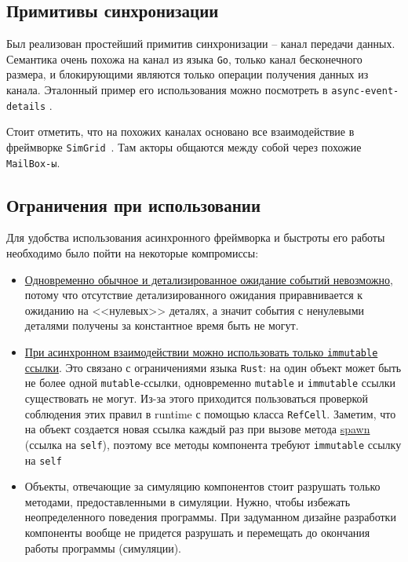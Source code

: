 \subsection{Примитивы синхронизации}

Был реализован простейший примитив синхронизации -- канал передачи данных. Семантика очень похожа на канал из языка \texttt{Go}, только канал бесконечного размера, и блокирующими являются только операции получения данных из канала. Эталонный пример его использования можно посмотреть в \texttt{async-event-details} \cite{async-event-details-example}. 

Стоит отметить, что на похожих каналах основано все взаимодействие в фреймворке \texttt{SimGrid}~\cite{simgrid-example}. Там акторы общаются между собой через похожие \texttt{MailBox-ы}.


\subsection{Ограничения при использовании}
Для удобства использования асинхронного фреймворка и быстроты его работы необходимо было пойти на некоторые компромиссы: 
\begin{itemize}
    \item 
    \underline{Одновременно обычное и детализированное ожидание событий невозможно}, потому что отсутствие детализированного ожидания приравнивается к ожиданию на <<нулевых>> деталях, а значит события с ненулевыми деталями получены за константное время быть не могут. 
     
    \item 
    \underline{При асинхронном взаимодействии можно использовать только \texttt{immutable} ссылки}. Это связано с ограничениями языка \texttt{Rust}: на один объект может быть не более одной \texttt{mutable}-ссылки, одновременно \texttt{mutable} и \texttt{immutable} ссылки существовать не могут. Из-за этого приходится пользоваться проверкой соблюдения этих правил в runtime с помощью класса \texttt{RefCell}. Заметим, что на объект создается новая ссылка каждый раз при вызове метода \hyperref[spawn]{spawn} (ссылка на \texttt{self}), поэтому все методы компонента требуют \texttt{immutable} ссылку на \texttt{self}
    
    \item 
    Объекты, отвечающие за симуляцию компонентов стоит разрушать только методами, предоставленными в симуляции. Нужно, чтобы избежать неопределенного поведения программы. При задуманном дизайне разработки компоненты вообще не придется разрушать и перемещать до окончания работы программы (симуляции).
    
\end{itemize}

